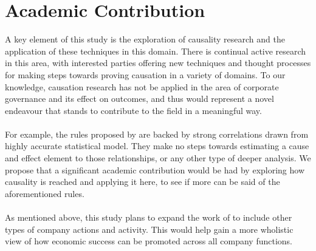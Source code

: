 \section{Academic Contribution}
{A key element of this study is the exploration of causality research and the application of these techniques in this domain. There is continual active research in this area, with interested parties offering new techniques and thought processes for making steps towards proving causation in a variety of domains. To our knowledge, causation research has not be applied in the area of corporate governance and its effect on outcomes, and thus would represent a novel endeavour that stands to contribute to the field in a meaningful way. \\\\ 
For example, the rules proposed by \cite{moldovan2015learning} are backed by strong correlations drawn from highly accurate statistical model. They make no steps towards estimating a cause and effect element to those relationships, or any other type of deeper analysis. We propose that a significant academic contribution would be had by exploring how causality is reached and applying it here, to see if more can be said of the aforementioned rules. \\\\
As mentioned above, this study plans to expand the work of \cite{moldovan2015learning} to include other types of company actions and activity. This would help gain a more wholistic view of how economic success can be promoted across all company functions. }
